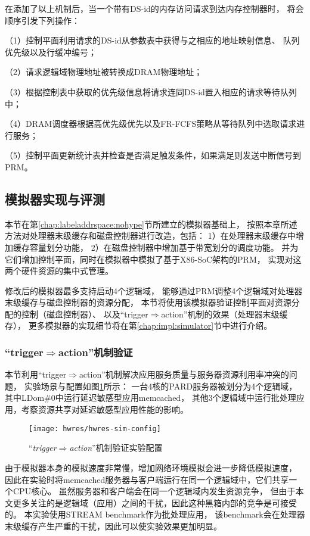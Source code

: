 在添加了以上机制后，当一个带有DS-id的内存访问请求到达内存控制器时，
将会顺序引发下列操作：

（1）控制平面利用请求的DS-id从参数表中获得与之相应的地址映射信息、
队列优先级以及行缓冲编号；

（2）请求逻辑域物理地址被转换成DRAM物理地址；

（3）根据控制表中获取的优先级信息将请求连同DS-id置入相应的请求等待队列中；

（4）DRAM调度器根据高优先级优先以及FR-FCFS\cite{rixner_memory_2000}策略从等待队列中选取请求进行服务；

（5）控制平面更新统计表并检查是否满足触发条件，如果满足则发送中断信号到PRM。


\subsection{模拟器实现与评测}

本节在第\ref{chap:labeladdrspace:nohype}节所建立的模拟器基础上，
按照本章所述方法对处理器末级缓存和磁盘控制器进行改造，包括：
1）在处理器末级缓存中增加缓存容量划分功能，
2）在磁盘控制器中增加基于带宽划分的调度功能。
并为它们增加控制平面，同时在模拟器中模拟了基于X86-SoC架构的PRM，
实现对这两个硬件资源的集中式管理。

修改后的模拟器最多支持启动4个逻辑域，
能够通过PRM调整4个逻辑域对处理器末级缓存与磁盘控制器的资源分配，
本节将使用该模拟器验证控制平面对资源分配的控制（磁盘控制器）、
以及``trigger$\Rightarrow$action''机制的效果（处理器末级缓存），
更多模拟器的实现细节将在第\ref{chap:impl:simulator}节中进行介绍。


\subsubsection{``trigger$\Rightarrow$action''机制验证}

本节利用``trigger$\Rightarrow$action''机制解决应用服务质量与服务器资源利用率冲突的问题，
实验场景与配置如图\ref{fig:hwres-sim-config}所示：
一台4核的PARD服务器被划分为4个逻辑域，其中LDom\#0中运行延迟敏感型应用memcached，
其他3个逻辑域中运行批处理应用，考察资源共享对延迟敏感型应用性能的影响。

\begin{figure}[tb]
  \centering
  \texttt{[image: hwres/hwres-sim-config]}
  \caption{``\emph{trigger$\Rightarrow$action}''机制验证实验配置}
  \label{fig:hwres-sim-config}
\end{figure}

由于模拟器本身的模拟速度非常慢，增加网络环境模拟会进一步降低模拟速度，
因此在实验时将memcached服务器与客户端运行在同一个逻辑域中，它们共享一个CPU核心。
虽然服务器和客户端会在同一个逻辑域内发生资源竞争，
但由于本文更多关注的是逻辑域（应用）之间的干扰，因此这种黑箱内部的竞争是可接受的。
本实验使用STREAM benchmark\cite{stream}作为批处理应用，
该benchmark会在处理器末级缓存产生严重的干扰，因此可以使实验效果更加明显。

